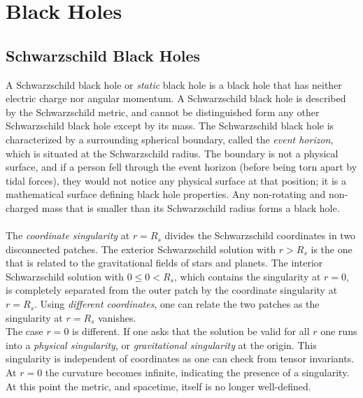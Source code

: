		
		
		
		
		
		
		
		
		
		
		
		
		
		


\newpage
\section{Black Holes}
\subsection{Schwarzschild Black Holes}
A Schwarzschild black hole or \emph{static} black hole is a black hole that has neither electric charge nor angular momentum. A Schwarzschild black hole is described by the Schwarzschild metric, and cannot be distinguished form any other Schwarzschild black hole except by its mass. The Schwarzschild black hole is characterized by a surrounding spherical boundary, called the \emph{event horizon}, which is situated at the Schwarzschild radius. The boundary is not a physical surface, and if a person fell through the event horizon (before being torn apart by tidal forces), they would not notice any physical surface at that position; it is a mathematical surface defining black hole properties. Any non-rotating and non-charged mass that is smaller than its Schwarzschild radius forms a black hole.\\
\\
The \emph{coordinate singularity} at $r=R_s$ divides the Schwarzschild coordinates in two disconnected patches. The exterior Schwarzschild solution with $r>R_s$ is the one that is related to the gravitational fields of stars and planets. The interior Schwarzschild solution with $0 \leq 0 < R_s$, which contains the singularity at $r=0$, is completely separated from the outer patch by the coordinate singularity at $r=R_s$. Using \emph{different coordinates}, one can relate the two patches as the singularity at $r=R_s$ vanishes.\\
The case $r=0$ is different. If one asks that the solution be valid for all $r$ one runs into a \emph{physical singularity}, or \emph{gravitational singularity} at the origin. This singularity is independent of coordinates as one can check from tensor invariants. At $r=0$ the curvature becomes infinite, indicating the presence of a singularity. At this point the metric, and spacetime, itself is no longer well-defined.\\
